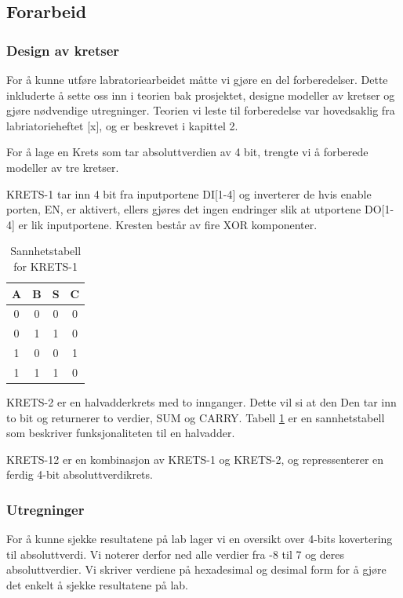 \documentclass{article}
\begin{document}
\subsection{Forarbeid}
\subsubsection{Design av kretser}
For å kunne utføre labratoriearbeidet måtte vi gjøre en del forberedelser. Dette inkluderte å sette oss inn i teorien bak prosjektet, designe modeller av kretser og gjøre nødvendige utregninger. Teorien vi leste til forberedelse var hovedsaklig fra labriatorieheftet [x], og er beskrevet i kapittel 2.

For å lage en Krets som tar absoluttverdien av 4 bit, trengte vi å forberede modeller av tre kretser.

KRETS-1 tar inn 4 bit fra inputportene DI[1-4] og inverterer de hvis enable porten, EN, er aktivert, ellers gjøres det ingen endringer slik at utportene DO[1-4] er lik inputportene. Kresten består av fire XOR komponenter.

\begin{table}[h]
	\centering
	\caption{Sannhetstabell for KRETS-1}
	\label{tab:sannhet1}
	\vspace{0.2cm}
	\begin{tabular} {| c | c | c | c |} \hline
		A & B & S & C \\ \hline
		0 & 0 & 0 & 0 \\ \hline
		0 & 1 & 1 & 0 \\ \hline
		1 & 0 & 0 & 1 \\ \hline
		1 & 1 & 1 & 0 \\ \hline
	\end{tabular}
\end{table}


KRETS-2 er en halvadderkrets med to innganger. Dette vil si at den Den tar inn to bit og returnerer to verdier, SUM og CARRY. Tabell \ref{tab:sannhet1} er en sannhetstabell som beskriver funksjonaliteten til en halvadder.

KRETS-12 er en kombinasjon av KRETS-1 og KRETS-2, og repressenterer en ferdig 4-bit absoluttverdikrets.

\subsubsection{Utregninger}
For å kunne sjekke resultatene på lab lager vi en oversikt over 4-bits kovertering til absoluttverdi. Vi noterer derfor ned alle verdier fra -8 til 7 og deres absoluttverdier. Vi skriver verdiene på hexadesimal og desimal form for å gjøre det enkelt å sjekke resultatene på lab.
\end{document}
